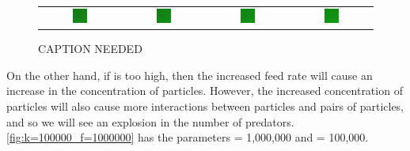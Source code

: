 \begin{figure}[h]
\begin{tabular}{c c c c}
\includegraphics[width = 0.2\textwidth]{../images/predator_prey_predator_dies_f1e1_r5e5_i4.png} & \includegraphics[width = 0.2\textwidth]{../images/../images/predator_prey_predator_dies_f1e1_r5e5_i5.png} & \includegraphics[width = 0.2\textwidth]{../images/../images/predator_prey_predator_dies_f1e1_r5e5_i6.png} & \includegraphics[width = 0.2\textwidth]{../images/../images/predator_prey_predator_dies_f1e1_r5e5_i7.png}
\end{tabular}
\caption{CAPTION NEEDED}
\label{fig:k=500000_f=1000}
\end{figure}

On the other hand, if  is too high, then the increased feed rate will cause an increase in the concentration of  particles. However, the increased concentration of  particles will also cause more interactions between  particles and pairs of  particles, and so we will see an explosion in the number of predators. \autoref{fig:k=100000_f=1000000} has the parameters  = 1,000,000 and  = 100,000.\\

